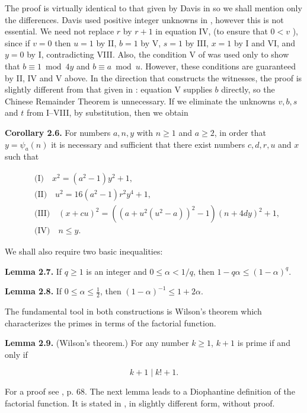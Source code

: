 \documentclass[10pt,letterpaper]{article}
\newcommand{\statement}[1]{\par\medskip\noindent\textbf{#1}\enspace}
\begin{document}
The proof is virtually identical to that given by Davis in \cite{ref3} so we shall mention only the differences. Davis used positive integer unknowns in \cite{ref3}, however this is not essential. We need not replace $r$ by $r+1$ in equation IV, (to ensure that $0<v$ ), since if $v=0$ then $u=1$ by II, $b=1$ by V, $s=1$ by III, $x=1$ by I and VI, and $y=0$ by I, contradicting VIII. Also, the condition V of \cite{ref3} was used only to show that $b \equiv 1 \bmod 4 y$ and $b \equiv a \bmod u$. However, these conditions are guaranteed by II, IV and V above. In the direction that constructs the witnesses, the proof is slightly different from that given in \cite{ref3}: equation V supplies $b$ directly, so the Chinese Remainder Theorem is unnecessary. If we eliminate the unknowns $v, b, s$ and $t$ from I--VIII, by substitution, then we obtain

\statement{Corollary 2.6.} For numbers $a,n,y$ with $n\geq1$ and $a\geq2$, in order that $y=\psi_{a}(n)$ it is necessary and sufficient that there exist numbers $c, d, r, u$ and $x$ such that

\begin{align*}
&\text{(I)}\quad x^{2}=\left(a^{2}-1\right) y^{2}+1,\\
&\text{(II)}\quad u^{2}=16\left(a^{2}-1\right) r^{2} y^{4}+1,\\
&\text{(III)}\quad (x+c u)^{2}=\left(\left(a+u^{2}\left(u^{2}-a\right)\right)^{2}-1\right)(n+4 d y)^{2}+1,\\
&\text{(IV)}\quad n \leq y.
\end{align*}

We shall also require two basic inequalities:

\statement{Lemma 2.7.} If $q\geq1$ is an integer and $0\leq\alpha<1/q$, then $1-q \alpha \leq(1-\alpha)^{q}$.

\statement{Lemma 2.8.} If $0 \leq \alpha \leq \frac{1}{2}$, then $(1-\alpha)^{-1} \leq 1+2 \alpha$.

The fundamental tool in both constructions is Wilson's theorem which characterizes the primes in terms of the factorial function.

\statement{Lemma 2.9.} (Wilson's theorem.) For any number $k\geq1$, $k+1$ is prime if and only if

\[
k+1 \mid k!+1 .
\]

For a proof see \cite{ref6}, p. 68. The next lemma leads to a Diophantine definition of the factorial function. It is stated in \cite{ref10}, in slightly different form, without proof.
\end{document}
